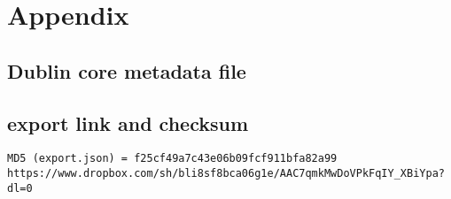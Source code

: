 \appendix
\section{Appendix}\label{sec:appendix}
\subsection{Dublin core metadata file}

\subsection{export link and checksum}
\begin{lstlisting}
MD5 (export.json) = f25cf49a7c43e06b09fcf911bfa82a99
https://www.dropbox.com/sh/bli8sf8bca06g1e/AAC7qmkMwDoVPkFqIY_XBiYpa?dl=0
\end{lstlisting}



